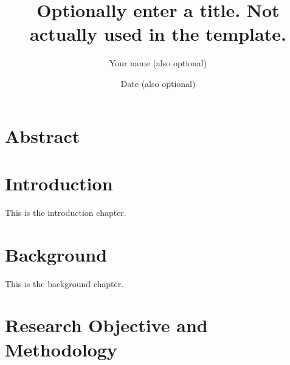 \documentclass[a4paper,12pt]{article}
\title{Optionally enter a title. Not actually used in the template.}
\author{Your name (also optional)}
\date{Date (also optional)}
\begin{document}
    
\clearpage


\section*{Abstract}
\clearpage

    
\clearpage

    \tableofcontents
\clearpage

    \listoffigures
\clearpage



\section{Introduction}
\label{sec_intro}

This is the introduction chapter.

\clearpage

\section{Background}
\label{sec_background}

This is the background chapter.

\clearpage

\section{Research Objective and Methodology}
\end{document}
